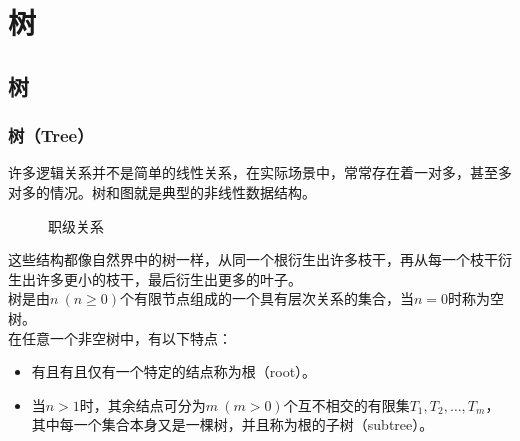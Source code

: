 \chapter{树}

\section{树}

\subsection{树（Tree）}

许多逻辑关系并不是简单的线性关系，在实际场景中，常常存在着一对多，甚至多对多的情况。树和图就是典型的非线性数据结构。\\

\begin{figure}[H]
	\centering
	\caption{职级关系}
\end{figure}

这些结构都像自然界中的树一样，从同一个根衍生出许多枝干，再从每一个枝干衍生出许多更小的枝干，最后衍生出更多的叶子。\\

树是由$ n\ (n \ge 0) $个有限节点组成的一个具有层次关系的集合，当$ n = 0 $时称为空树。\\

在任意一个非空树中，有以下特点：

\begin{itemize}
	\item 有且有且仅有一个特定的结点称为根（root）。

	\item 当$ n > 1 $时，其余结点可分为$ m\ (m > 0) $个互不相交的有限集$ T_1, T_2, \dots, T_m $，其中每一个集合本身又是一棵树，并且称为根的子树（subtree）。
\end{itemize}

\vspace{0.5cm}

